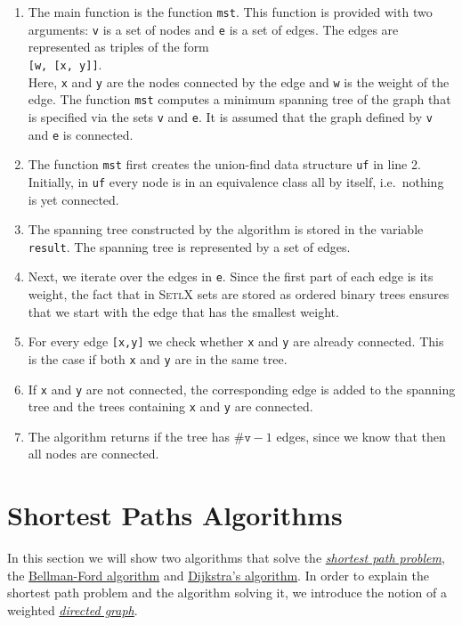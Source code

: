 \begin{enumerate}
\item The main function is the function \texttt{mst}.  This function is provided with two arguments:
      \texttt{v} is a set of nodes and \texttt{e} is a set of edges.  The edges are represented as
      triples of the form
      \\[0.2cm]
      \hspace*{1.3cm}
      \texttt{[w, [x, y]]}.
      \\[0.2cm] 
      Here, \texttt{x} and \texttt{y} are the nodes connected by the edge and \texttt{w} is the
      weight of the edge.  The function \texttt{mst} computes a minimum spanning tree of  the
      graph that is specified via the sets \texttt{v} and \texttt{e}.  It is assumed that the graph
      defined by \texttt{v} and \texttt{e} is connected.
\item The function \texttt{mst} first creates the union-find data structure \texttt{uf} in line 2.
      Initially, in \texttt{uf} every node is in an equivalence class all by itself, i.e.~nothing is
      yet connected.
\item The spanning tree constructed by the algorithm is stored in the variable \texttt{result}.
      The spanning tree is represented by a set of edges.  
\item Next, we iterate over the edges in \texttt{e}.  Since the first part of each edge is its
      weight, the fact that in \textsc{SetlX} sets are stored as ordered binary trees ensures that
      we start with the edge that has the smallest weight.
\item For every edge \texttt{[x,y]} we check whether \texttt{x} and \texttt{y} are already
      connected.  This is the case if both \texttt{x} and \texttt{y} are in the same tree.
\item If \texttt{x} and \texttt{y} are not connected, the corresponding edge is added to the
      spanning tree and the trees containing \texttt{x} and \texttt{y} are connected.
\item The algorithm returns if the tree has $\texttt{\#v}-1$ edges, since we know that then all nodes
      are connected.
\end{enumerate}
\pagebreak

\section{Shortest Paths Algorithms}
In this section we will show two algorithms that solve the
\href{https://en.wikipedia.org/wiki/Shortest_path_problem}{\emph{shortest path problem}}, the 
\href{https://en.wikipedia.org/wiki/Bellman-Ford_algorithm}{Bellman-Ford algorithm} and
\href{https://en.wikipedia.org/wiki/Dijkstra%27s_algorithm}{Dijkstra's algorithm}.  
In order to explain the shortest path problem and the algorithm solving it, we introduce the notion
of a weighted \href{https://en.wikipedia.org/wiki/Directed_graph}{\emph{directed graph}}.


